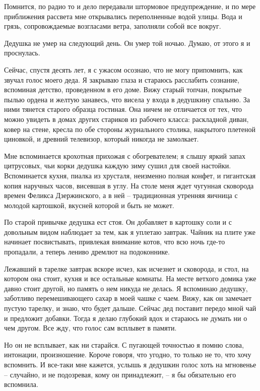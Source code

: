\documentclass[
]{book}
\begin{document}
Помнится, по радио то и дело передавали штормовое предупреждение, и по мере приближения рассвета мне открывались переполненные водой улицы. Вода и грязь, сопровождаемые возгласами ветра, заполняли собой все вокруг.

Дедушка не умер на следующий день. Он умер той ночью. Думаю, от этого я и проснулась.

Сейчас, спустя десять лет, я с ужасом осознаю, что не могу припомнить, как звучал голос моего деда. Я закрываю глаза и стараюсь расслабить сознание, вспоминая детство, проведенном в его доме. Вижу старый топчан, покрытые пылью ордена и желтую занавесь, что висела у входа в дедушкину спальню. За ними тянется старого образца гостиная. Она ничем не отличается от тех, что можно увидеть в домах других стариков из рабочего класса: раскладной диван, ковер на стене, кресла по обе стороны журнального столика, накрытого плетеной циновкой, и древний телевизор, который никогда не замолкает.

Мне вспоминается крохотная прихожая с обогревателем; я слышу яркий запах цитрусовых, чьи корки дедушка каждую зиму сушил для своей настойки. Вспоминается кухня, пиалка из хрусталя, неизменно полная конфет, и гигантская копия наручных часов, висевшая в углу. На столе меня ждет чугунная сковорода времен Феликса Дзержинского, а в ней -- традиционная утренняя яичница с молодой картошкой, вкусней которой и быть не может.

По старой привычке дедушка ест стоя. Он добавляет в картошку соли и с довольным видом наблюдает за тем, как я уплетаю завтрак. Чайник на плите уже начинает посвистывать, привлекая внимание котов, что всю ночь где-то пропадали, а теперь лениво дремлют на подоконнике.

Лежавший в тарелке завтрак вскоре исчез, как исчезнет и сковорода, и стол, на котором она стоит, кухня и все остальные комнаты. На месте ветхого домика уже давно стоит другой, но память о нем никуда не делась. Я вспоминаю дедушку, заботливо перемешивающего сахар в моей чашке с чаем. Вижу, как он замечает пустую тарелку, и знаю, что будет дальше. Сейчас дед поставит передо мной чай и предложит добавки. Тогда я делаю глубокий вдох и стараюсь не думать ни о чем другом. Все жду, что голос сам всплывет в памяти.

Но он не всплывает, как ни старайся. С пугающей точностью я помню слова, интонации, произношение. Короче говоря, что угодно, то только не то, что хочу вспомнить. И все-таки мне кажется, услышь я дедушкин голос хоть на мгновенье -- случайно, и не подозревая, кому он принадлежит, -- я бы обязательно его вспомнила.
\end{document}

